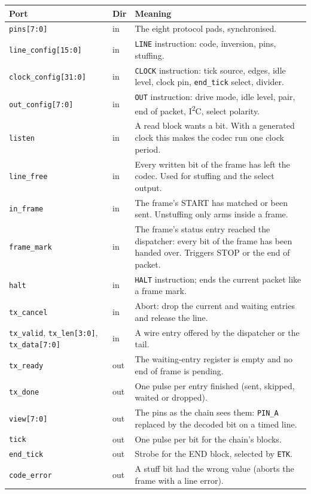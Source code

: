 \documentclass[11pt,a4paper]{article}
\newcommand{\sig}[1]{\texttt{#1}}
\begin{document}
\begin{longtable}{@{}l l p{8.4cm}@{}}
\toprule
Port & Dir & Meaning \\
\midrule
\endhead
\sig{pins[7:0]} & in & The eight protocol pads, synchronised. \\
\sig{line\_config[15:0]} & in & \sig{LINE} instruction: code, inversion, pins, stuffing. \\
\sig{clock\_config[31:0]} & in & \sig{CLOCK} instruction: tick source, edges, idle level, clock pin, \sig{end\_tick} select, divider. \\
\sig{out\_config[7:0]} & in & \sig{OUT} instruction: drive mode, idle level, pair, end of packet, I\textsuperscript{2}C, select polarity. \\
\sig{listen} & in & A read block wants a bit. With a generated clock this makes the codec run one clock period. \\
\sig{line\_free} & in & Every written bit of the frame has left the codec. Used for stuffing and the select output. \\
\sig{in\_frame} & in & The frame's START has matched or been sent. Unstuffing only arms inside a frame. \\
\sig{frame\_mark} & in & The frame's status entry reached the dispatcher: every bit of the frame has been handed over. Triggers STOP or the end of packet. \\
\sig{halt} & in & \sig{HALT} instruction; ends the current packet like a frame mark. \\
\sig{tx\_cancel} & in & Abort: drop the current and waiting entries and release the line. \\
\sig{tx\_valid}, \sig{tx\_len[3:0]}, \sig{tx\_data[7:0]} & in & A wire entry offered by the dispatcher or the tail. \\
\midrule
\sig{tx\_ready} & out & The waiting-entry register is empty and no end of frame is pending. \\
\sig{tx\_done} & out & One pulse per entry finished (sent, skipped, waited or dropped). \\
\sig{view[7:0]} & out & The pins as the chain sees them: \sig{PIN\_A} replaced by the decoded bit on a timed line. \\
\sig{tick} & out & One pulse per bit for the chain's blocks. \\
\sig{end\_tick} & out & Strobe for the END block, selected by \sig{ETK}. \\
\sig{code\_error} & out & A stuff bit had the wrong value (aborts the frame with a line error). \\

\end{longtable}
\end{document}
